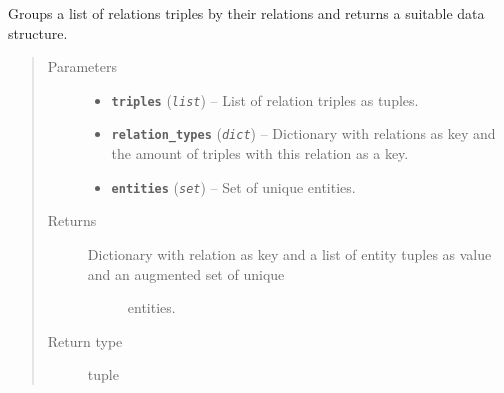 \documentclass[letterpaper,10pt,english]{sphinxmanual}
\begin{document}

\begin{fulllineitems}
\label{src.trans_e:src.trans_e.trans_we.transform_triples}
Groups a list of relations triples by their relations and returns a suitable data structure.
\begin{quote}\begin{description}
\item[{Parameters}] \leavevmode\begin{itemize}
\item {} 
\textbf{\texttt{triples}} (\emph{\texttt{list}}) -- List of relation triples as tuples.

\item {} 
\textbf{\texttt{relation\_types}} (\emph{\texttt{dict}}) -- Dictionary with relations as key and the amount of triples with this relation as a key.

\item {} 
\textbf{\texttt{entities}} (\emph{\texttt{set}}) -- Set of unique entities.

\end{itemize}

\item[{Returns}] \leavevmode
\begin{description}
\item[{Dictionary with relation as key and a list of entity tuples as value and an augmented set of unique}] \leavevmode
entities.

\end{description}


\item[{Return type}] \leavevmode
tuple

\end{description}\end{quote}

\end{fulllineitems}

\end{document}
